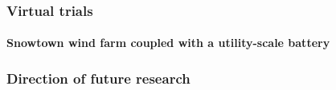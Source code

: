 \documentclass[presentation, smaller, table, svgnames]{beamer}
\begin{document}
\begin{frame}
	\frametitle{Virtual trials}
	\framesubtitle{Snowtown wind farm coupled with a utility-scale battery}

	\begin{figure}[!h]
		\centering
    		\label{fig:disp_wind_bess}
		\scalebox{0.75}{
			
		}
	\end{figure}

\end{frame}


\begin{frame}
	\frametitle{Direction of future research}
	\framesubtitle{}

	
\end{frame}

\end{document}
